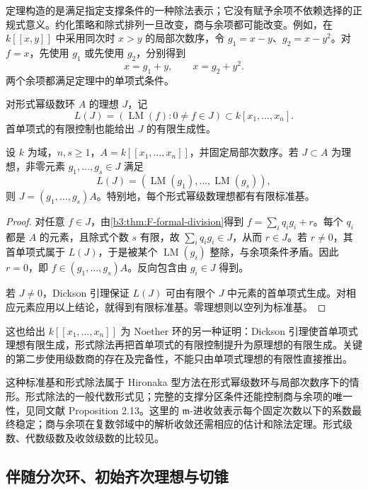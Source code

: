 定理构造的是满足指定支撑条件的一种除法表示；它没有赋予余项不依赖选择的正规式意义。约化策略和除式排列一旦改变，商与余项都可能改变。例如，在 \(k[\![x,y]\!]\) 中采用同次时 \(x>y\) 的局部次数序，令 \(g_1=x-y\)、\(g_2=x-y^2\)。对 \(f=x\)，先使用 \(g_1\) 或先使用 \(g_2\)，分别得到
\[
	x=g_1+y,\qquad x=g_2+y^2.
\]
两个余项都满足定理中的单项式条件。

\ProseParagraphBreak
对形式幂级数环 \(A\) 的理想 \(J\)，记
\[
	L(J)=(\operatorname{LM}(f):0\ne f\in J) \subset k[x_1,\ldots,x_n].
\]
首单项式的有限控制也能给出 \(J\) 的有限生成性。

\begin{proposition}\label{b3:prop:F-formal-standard-basis}
	设 \(k\) 为域，\(n,s\ge1\)，\(A=k[\![x_1,\ldots,x_n]\!]\)，并固定局部次数序。若 \(J\subset A\) 为理想，非零元素 \(g_1,\ldots,g_s\in J\) 满足
	\[
		L(J)=(\operatorname{LM}(g_1),\ldots,\operatorname{LM}(g_s)),
	\]
	则 \(J=(g_1,\ldots,g_s)A\)。特别地，每个形式幂级数理想都有有限标准基。
\end{proposition}
\begin{proof}
	对任意 \(f\in J\)，由\cref{b3:thm:F-formal-division}得到 \(f=\sum_iq_i g_i+r\)。每个 \(q_i\) 都是 \(A\) 的元素，且除式个数 \(s\) 有限，故 \(\sum_iq_i g_i\in J\)，从而 \(r\in J\)。若 \(r\ne0\)，其首单项式属于 \(L(J)\)，于是被某个 \(\operatorname{LM}(g_i)\) 整除，与余项条件矛盾。因此 \(r=0\)，即 \(f\in(g_1,\ldots,g_s)A\)。反向包含由 \(g_i\in J\) 得到。

	若 \(J\ne0\)，Dickson 引理保证 \(L(J)\) 可由有限个 \(J\) 中元素的首单项式生成。对相应元素应用以上结论，就得到有限标准基。零理想则以空列为标准基。
\end{proof}

这也给出 \(k[\![x_1,\ldots,x_n]\!]\) 为 Noether 环的另一种证明：Dickson 引理使首单项式理想有限生成，形式除法再把首单项式的有限控制提升为原理想的有限生成。关键的第二步使用级数商的存在及完备性，不能只由单项式理想的有限性直接推出。

\ProseParagraphBreak

这种标准基和形式除法属于 Hironaka 型方法在形式幂级数环与局部次数序下的情形。形式除法的一般代数形式见\cite[Section 2, Theorem 2.1]{Aschenbrenner2005ReductionStandardBases}；完整的支撑分区条件还能控制商与余项的唯一性，见同文献 Proposition 2.13。这里的 \(\mathfrak m\)-进收敛表示每个固定次数以下的系数最终稳定；商与余项在复数邻域中的解析收敛还需相应的估计和除法定理。形式级数、代数级数及收敛级数的比较见。

\subsection{伴随分次环、初始齐次理想与切锥}
\label{b3:subsec:F03:02}

